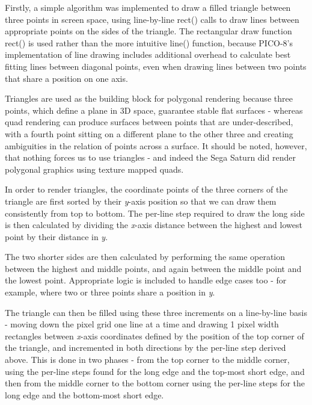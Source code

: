 \documentclass[11pt]{article}
\begin{document}
Firstly, a simple algorithm was implemented to draw a filled triangle between three points
in screen space, using line-by-line rect() calls to draw lines between appropriate points on the
sides of the triangle. The rectangular draw function rect() is used
rather than the more intuitive line() function, because PICO-8's implementation of line drawing
includes additional overhead to calculate best fitting lines between diagonal points, even when
drawing lines between two points that share a position on one axis.

Triangles are used as the building block for polygonal rendering because three points, which define
a plane in 3D space, guarantee stable flat surfaces - whereas quad rendering can produce surfaces
between points that are under-described, with a fourth point sitting on a different plane to the
other three and creating ambiguities in the relation of points across a surface. It should be
noted, however, that nothing forces us to use triangles - and indeed the Sega Saturn did render
polygonal graphics using texture mapped quads.


In order to render triangles, the coordinate points of the three corners of the triangle are first sorted by their
\textit{y}-axis position so that we can draw them consistently from top to bottom. The per-line step required to
draw the long side is then calculated by dividing the \textit{x}-axis distance between the highest and lowest point
by their distance in \textit{y}.

The two shorter sides are then calculated by performing the same operation between the highest
and middle points, and again between the middle point and the lowest point. Appropriate logic is
included to handle edge cases too - for example, where two or three points share a position in
\textit{y}.

The triangle can then be filled using these three increments on a line-by-line basis - moving down
the pixel grid one line at a time and drawing 1 pixel width rectangles between \textit{x}-axis coordinates
defined by the position of the top corner of the triangle, and incremented in both directions by the per-line
step derived above. This is done in two phases - from the top corner to the middle corner, using the per-line
steps found for the long edge and the top-most short edge, and then from the middle corner to the bottom
corner using the per-line steps for the long edge and the bottom-most short edge.
\end{document}
